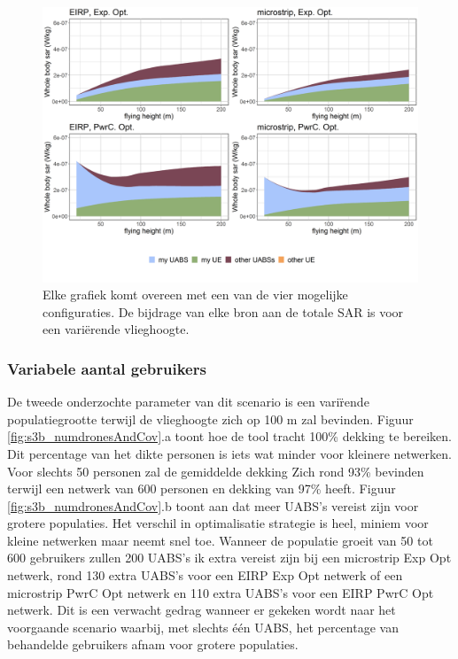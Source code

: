 \documentclass[twocolumn]{phdsymp_dutch}
\begin{document}
\begin{figure}[h!]
  \includegraphics[width=\linewidth]{../results/s3/fhFourSources.png}
  \caption{Elke grafiek komt overeen met een van de vier mogelijke configuraties.
   De bijdrage van elke bron aan de totale \acs{SAR} is voor een variërende vlieghoogte.}
  \label{fig:s3a_fourSourcesMatrix}
\end{figure}

\subsubsection{Variabele aantal gebruikers}
De tweede onderzochte parameter van dit scenario is een vari\"rende populatiegrootte
terwijl de vlieghoogte zich op 100 m zal bevinden.
Figuur  \ref{fig:s3b_numdronesAndCov}.a toont hoe de tool tracht 100\% dekking te bereiken.
Dit percentage van het dikte personen is iets wat minder voor kleinere netwerken. 
Voor slechts 50 personen zal de gemiddelde dekking
Zich rond 93\% bevinden terwijl een netwerk van 600 personen en dekking van 97\% heeft.
Figuur \ref{fig:s3b_numdronesAndCov}.b toont aan dat meer \gls{UABS}'s  vereist zijn voor grotere populaties.
Het verschil in optimalisatie strategie is heel, miniem voor kleine netwerken maar neemt snel toe. 
Wanneer de populatie groeit van 50 tot 600 gebruikers zullen 200 \gls{UABS}'s ik extra vereist zijn bij een
 microstrip \gls{Exp Opt} netwerk,
 rond 130 extra \gls{UABS}'s voor een \gls{EIRP} \gls{Exp Opt} netwerk of een microstrip \gls{PwrC Opt} netwerk
 en 110 extra \gls{UABS}'s voor een \gls{EIRP} \gls{PwrC Opt} netwerk.
Dit is een verwacht gedrag wanneer er gekeken wordt naar het voorgaande scenario waarbij,
 met slechts \'e\'en \gls{UABS}, het percentage van behandelde gebruikers afnam voor grotere populaties.
\end{document}
